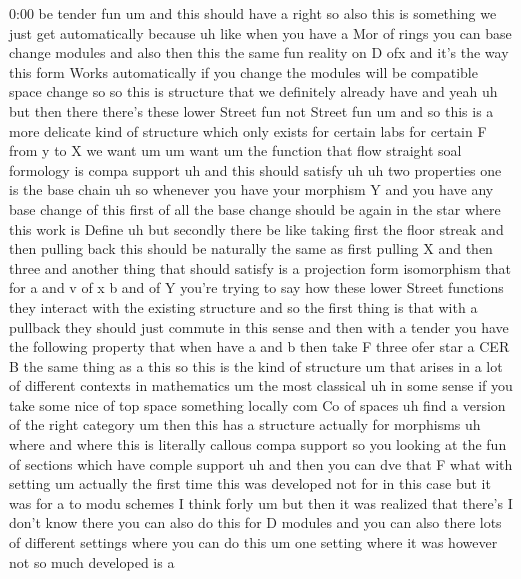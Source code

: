\begin{unfinished}{0:00}
be  tender
fun
um  and  this  should  have  a
right  so  also  this  is  something  we  just
get  automatically  because  uh  like  when
you  have  a  Mor  of  rings  you  can  base
change  modules  and  also  then  this  the
same  fun  reality  on  D  ofx
and  it's  the  way  this  form  Works
automatically  if  you  change  the  modules
will  be  compatible  space  change  so  so
this  is  structure  that  we  definitely
already  have
and  yeah  uh  but  then  there  there's  these
lower  Street  fun  not  Street  fun  um  and
so  this  is  a  more  delicate  kind  of
structure  which  only  exists  for  certain
labs  for  certain  F  from  y  to
X  we  want
um
um  want  um  the  function  that  flow
straight
soal  formology  is  compa
support  uh  and  this  should  satisfy
uh  uh  two
properties
one  is  the  base
chain  uh  so  whenever  you  have  your
morphism
Y  and  you  have  any  base  change  of
this  first  of  all  the  base  change  should
be  again  in  the  star  where  this  work  is
Define  uh  but  secondly  there
be  like  taking  first  the  floor
streak  and  then  pulling  back  this  should
be  naturally  the  same  as  first  pulling  X
and
then
three  and  another  thing  that  should
satisfy  is  a  projection  form
isomorphism  that  for
a  and  v  of
x  b  and  of
Y  you're  trying  to  say  how  these  lower
Street  functions  they  interact  with  the
existing  structure  and  so  the  first
thing  is  that  with  a  pullback  they
should  just  commute  in  this  sense  and
then  with  a  tender  you  have  the
following  property  that  when  have  a  and
b  then  take  F  three
ofer  star  a
CER
B  the  same  thing
as  a
this
so  this  is  the  kind  of  structure  um  that
arises  in  a  lot  of  different  contexts  in
mathematics  um  the  most
classical  uh  in  some  sense  if  you  take
some  nice  of  top  space  something  locally
com  Co  of
spaces  uh  find  a  version  of  the  right
category  um  then  this  has  a  structure
actually  for
morphisms
uh  where  and  where  this  is  literally
callous  compa  support  so  you  looking  at
the  fun  of  sections  which  have  comple
support  uh  and  then  you  can  dve  that  F
what  with  setting
um  actually  the  first  time  this  was
developed  not  for  in  this  case  but  it
was  for  a  to  modu  schemes  I  think
forly  um  but  then  it  was  realized  that
there's  I  don't  know  there  you  can  also
do  this  for  D  modules  and  you  can  also
there  lots  of  different  settings  where
you  can  do  this  um  one  setting  where  it
was  however  not  so  much  developed  is  a

\end{unfinished}

